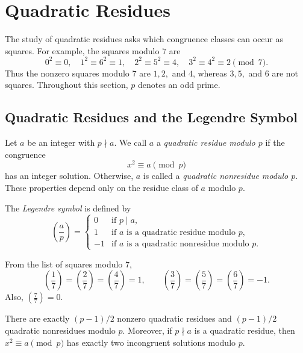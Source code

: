 \documentclass[a4paper,11pt,abstracton]{scrartcl}
\theoremstyle{dotlessP}
\theoremstyle{dotlessS}
\theoremstyle{remark}
\theoremstyle{definition}
\begin{document}
\section{Quadratic Residues}

The study of quadratic residues asks which congruence classes can occur
as squares. For example, the squares modulo $7$ are
\[
    0^2\equiv0,\quad 1^2\equiv6^2\equiv1,\quad
    2^2\equiv5^2\equiv4,\quad
    3^2\equiv4^2\equiv2\pmod7.
\]
Thus the nonzero squares modulo $7$ are $1,2,$ and $4$, whereas
$3,5,$ and $6$ are not squares. Throughout this section, $p$ denotes
an odd prime.

\subsection{Quadratic Residues and the Legendre Symbol}

\begin{definition_box}
Let $a$ be an integer with $p\nmid a$. We call $a$ a
\emph{quadratic residue modulo $p$} if the congruence
\[
    x^2\equiv a\pmod p
\]
has an integer solution. Otherwise, $a$ is called a
\emph{quadratic nonresidue modulo $p$}.
These properties depend only on the residue class of $a$ modulo $p$.
\end{definition_box}

\begin{definition_box}
The \emph{Legendre symbol} is defined by
\[
    \left(\frac ap\right)
      =
      \begin{cases}
          0 & \text{if $p\mid a$},\\
          1 & \text{if $a$ is a quadratic residue modulo $p$},\\
         -1 & \text{if $a$ is a quadratic nonresidue modulo $p$}.
      \end{cases}
\]
\end{definition_box}

\begin{example_box}
From the list of squares modulo $7$,
\[
    \left(\frac17\right)=\left(\frac27\right)
      =\left(\frac47\right)=1,
    \qquad
    \left(\frac37\right)=\left(\frac57\right)
      =\left(\frac67\right)=-1.
\]
Also, $\left(\frac77\right)=0$.
\end{example_box}

\begin{remark_box}
There are exactly $(p-1)/2$ nonzero quadratic residues and
$(p-1)/2$ quadratic nonresidues modulo $p$.
Moreover, if $p\nmid a$ is a quadratic residue, then
$x^2\equiv a\pmod p$ has exactly two incongruent solutions modulo $p$.
\end{remark_box}
\end{document}
